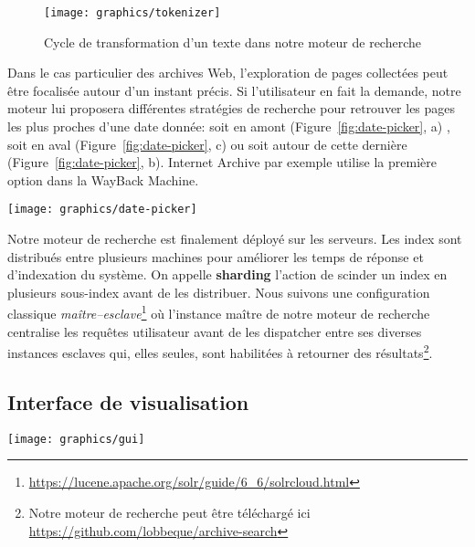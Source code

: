 \documentclass[symmetric,justified,marginals=raggedouter]{tufte-book}
\begin{document}
\begin{figure}%
  \texttt{[image: graphics/tokenizer]}
  \caption{Cycle de transformation d'un texte dans notre moteur de recherche}
  \label{fig:tokenizer}
\end{figure}

\noindent Dans le cas particulier des archives Web, l'exploration de pages collectées peut être focalisée autour d'un instant précis. Si l'utilisateur en fait la demande, notre moteur lui proposera différentes stratégies de recherche pour retrouver les pages les plus proches d'une date donnée: soit en amont (Figure~\ref{fig:date-picker}, a) , soit en aval (Figure~\ref{fig:date-picker}, c) ou soit autour de cette dernière (Figure~\ref{fig:date-picker}, b). Internet Archive par exemple utilise la première option dans la WayBack Machine.

\begin{figure*}%
  \texttt{[image: graphics/date-picker]}
  \caption{Stratégies de choix d'un ensemble de pages par rapport à une date précise}
  \label{fig:date-picker}
\end{figure*}

\noindent Notre moteur de recherche est finalement déployé sur les serveurs. Les index sont distribués entre plusieurs machines pour améliorer les temps de réponse et d'indexation du système. On appelle \textbf{sharding} l'action de scinder un index en plusieurs sous-index avant de les distribuer. Nous suivons une configuration classique \textit{maître--esclave}\footnote{\RaggedOuter \url{https://lucene.apache.org/solr/guide/6_6/solrcloud.html}} où l'instance maître de notre moteur de recherche centralise les requêtes utilisateur avant de les dispatcher entre ses diverses instances esclaves qui, elles seules, sont habilitées à retourner des résultats\footnote{\RaggedOuter Notre moteur de recherche peut être téléchargé ici \url{https://github.com/lobbeque/archive-search}}. 

\subsection{Interface de visualisation}

\begin{figure*}%
  \texttt{[image: graphics/gui]}
  \caption{Capture d'écran de notre interface de visualisation}
  \label{fig:gui}
\end{figure*}
\end{document}
